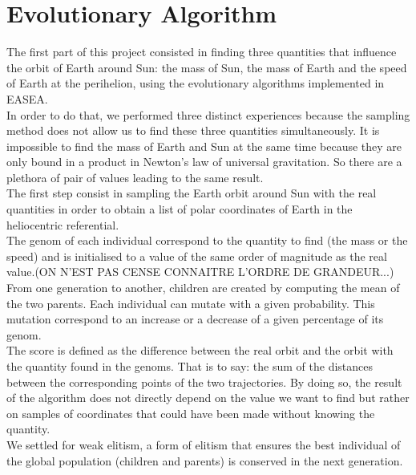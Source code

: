 \section{Evolutionary Algorithm}
The first part of this project consisted in finding three quantities that influence the orbit of Earth around Sun: the mass of Sun, the mass of Earth and the speed of Earth at the perihelion, using the evolutionary algorithms implemented in EASEA.\\

In order to do that, we performed three distinct experiences because the sampling method does not allow us to find these three quantities simultaneously. It is impossible to find the mass of Earth and Sun at the same time because they are only bound in a product in Newton's law of universal gravitation. So there are a plethora of pair of values leading to the same result.\\

The first step consist in sampling the Earth orbit around Sun with the real quantities in order to obtain a list of polar coordinates of Earth in the heliocentric referential.\\
The genom of each individual correspond to the quantity to find (the mass or the speed) and is initialised to a value of the same order of magnitude as the real value.(ON N'EST PAS CENSE CONNAITRE L'ORDRE DE GRANDEUR...)\\
From one generation to another, children are created by computing the mean of the two parents. Each individual can mutate with a given probability. This mutation correspond to an increase or a decrease of a given percentage of its genom.\\
The score is defined as the difference between the real orbit and the orbit with the quantity found in the genoms. That is to say: the sum of the distances between the corresponding points of the two trajectories. By doing so, the result of the algorithm does not directly depend on the value we want to find but rather on samples of coordinates that could have been made without knowing the quantity.\\
We settled for weak elitism, a form of elitism that ensures the best individual of the global population (children and parents) is conserved in the next generation.


